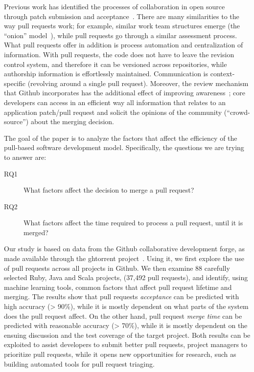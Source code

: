 \documentclass{sig-alternate}
\begin{document}
Previous work has identified the processes of collaboration in open source
through patch submission and acceptance~\cite{MOCKU02, Bird07, Weiss08}.  There
are many similarities to the way pull requests work; for example, similar work
team structures emerge (the ``onion'' model~\cite{Crows05}), while pull
requests go through a similar assessment process.  What pull requests
offer in addition is process automation and centralization of information.
With pull requests, the code does not have to leave the revision control
system, and therefore it can be versioned across repositories, while authorship
information is effortlessly maintained. Communication is context-specific
(revolving around a single pull request).  Moreover, the review
mechanism that Github incorporates has the additional effect of improving
awareness~\cite{Dabbi12}; core developers can access in an efficient way all
information that relates to an application patch/pull request and solicit the
opinions of the community (``crowd-source'') about the merging decision.

The goal of the paper is to analyze the factors that affect the efficiency
of the pull-based software development model. Specifically, the questions we are trying to answer are: 

\begin{description}

  \item[RQ1] What factors affect the decision to merge a pull request?

  \item[RQ2] What factors affect the time required to process a pull request,
    until it is merged?

\end{description}

Our study is based on data from the Github collaborative development forge, as
made available through the {\sc ght}orrent project~\cite{GS12}. Using it, we first
explore the use of pull requests across all projects in Github.  We then examine
88 carefully selected Ruby, Java and Scala projects, (37,492 pull requests), and
identify, using machine learning tools, common factors that affect pull request
lifetime and merging. The results show that pull requests \emph{acceptance}
can be predicted with high accuracy (> 90\%), while it is mostly dependent on
what parts of the system does the pull request affect.  On the other hand, pull
request \emph{merge time} can be predicted with reasonable accuracy (> 70\%),
while it is mostly dependent on the ensuing discussion and the test coverage of
the target project. Both results can be exploited to assist developers to
submit better pull requests, project managers to prioritize pull requests, while
it opens new opportunities for research, such as building automated tools for
pull request triaging.
\end{document}
